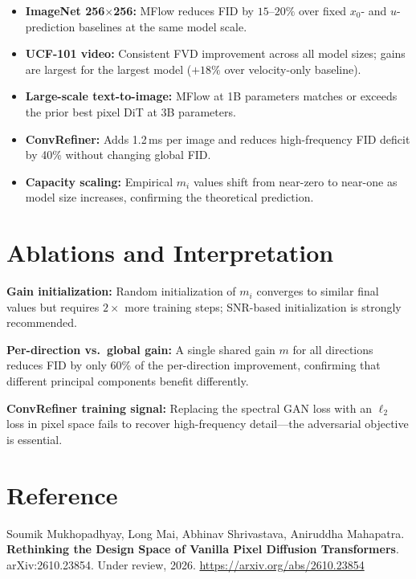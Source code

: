 \documentclass[10pt,twocolumn]{article}
\begin{document}
\begin{itemize}[itemsep=2pt,parsep=0pt]
  \item \textbf{ImageNet 256$\times$256:} MFlow reduces FID by
    $15$--$20\%$ over fixed $x_0$- and $u$-prediction baselines
    at the same model scale.
  \item \textbf{UCF-101 video:} Consistent FVD improvement across
    all model sizes; gains are largest for the largest model ($+18\%$
    over velocity-only baseline).
  \item \textbf{Large-scale text-to-image:} MFlow at 1B parameters
    matches or exceeds the prior best pixel DiT at 3B parameters.
  \item \textbf{ConvRefiner:} Adds 1.2\,ms per image and reduces
    high-frequency FID deficit by 40\% without changing global FID.
  \item \textbf{Capacity scaling:} Empirical $m_i$ values shift from
    near-zero to near-one as model size increases, confirming the
    theoretical prediction.
\end{itemize}

\section{Ablations and Interpretation}

\textbf{Gain initialization:}
Random initialization of $m_i$ converges to similar final values
but requires $2\times$ more training steps; SNR-based initialization
is strongly recommended.

\textbf{Per-direction vs.\ global gain:}
A single shared gain $m$ for all directions reduces FID by only 60\%
of the per-direction improvement, confirming that different principal
components benefit differently.

\textbf{ConvRefiner training signal:}
Replacing the spectral GAN loss with an $\ell_2$ loss in pixel space
fails to recover high-frequency detail---the adversarial objective
is essential.

\section*{Reference}

Soumik Mukhopadhyay, Long Mai, Abhinav Shrivastava, Aniruddha Mahapatra.
\textbf{Rethinking the Design Space of Vanilla Pixel Diffusion Transformers}.
arXiv:2610.23854. Under review, 2026.
\url{https://arxiv.org/abs/2610.23854}
\end{document}
